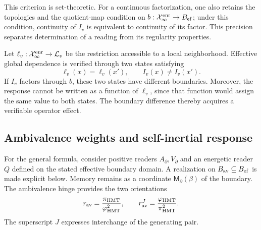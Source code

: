 This criterion is set-theoretic. For a continuous factorization, one
also retains the topologies and the quotient-map condition on
\(b:\mathcal X_\infty^{\rm enr}\to B_{\rm ef}\); under this condition,
continuity of \(I_v\) is equivalent to continuity of its factor. This precision
separates determination of a reading from its regularity properties.

Let \(\ell_v:\mathcal X_\infty^{\rm enr}\to\mathcal L_v\) be the
restriction accessible to a local neighborhood. Effective global dependence
is verified through two states satisfying
\begin{equation}
 \ell_v(x)=\ell_v(x'),\qquad I_v(x)\neq I_v(x').
 \label{vii:eq:observador-testigo-global}
\end{equation}
If \(I_v\) factors through \(b\), these two states have different
boundaries. Moreover, the response cannot be written as a function of
\(\ell_v\), since that function would assign the same value to both states.
The boundary difference thereby acquires a verifiable operator effect.

\subsection{Ambivalence weights and self-inertial response}
\label{vii:sec:observador-ambivalencia}

For the general formula, consider positive readers
\(A_\partial,V_\partial\) and an energetic reader \(Q\)
defined on the stated effective boundary domain.
A realization on
\(B_{\rm av}\subseteq B_{\rm ef}\) is made explicit below. Memory remains
as a coordinate \(\mathsf M_\partial(\beta)\) of the boundary. The
ambivalence hinge provides the two orientations
\[
 r_{\rm av}=\frac{\pi_{\rm HMT}}{\varphi_{\rm HMT}^2},\qquad
 r_{\rm av}^{J}=\frac{\varphi_{\rm HMT}}{\pi_{\rm HMT}^2}.
\]
The superscript \(J\) expresses interchange of the generating pair.
